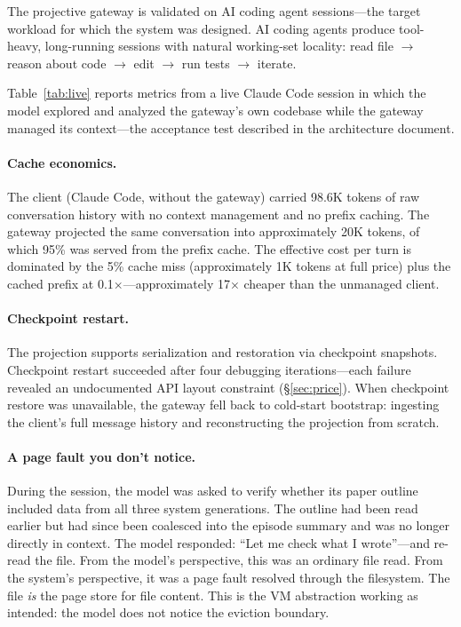 \documentclass[sigplan,screen,anonymous]{acmart}
\begin{document}
The projective gateway is validated on AI coding agent sessions---the
target workload for which the system was designed. AI coding agents
produce tool-heavy, long-running sessions with natural working-set
locality: read file $\to$ reason about code $\to$ edit $\to$ run
tests $\to$ iterate.

Table~\ref{tab:live} reports metrics from a live Claude Code session
in which the model explored and analyzed the gateway's own codebase
while the gateway managed its context---the acceptance test described
in the architecture document.

\paragraph{Cache economics.} The client (Claude Code, without the
gateway) carried 98.6K tokens of raw conversation history with no
context management and no prefix caching. The gateway projected the
same conversation into approximately 20K tokens, of which 95\% was
served from the prefix cache. The effective cost per turn is dominated
by the 5\% cache miss (approximately 1K tokens at full price) plus
the cached prefix at 0.1$\times$---approximately 17$\times$ cheaper
than the unmanaged client.

\paragraph{Checkpoint restart.} The projection supports serialization
and restoration via checkpoint snapshots. Checkpoint restart succeeded
after four debugging iterations---each failure revealed an
undocumented API layout constraint (\S\ref{sec:price}). When
checkpoint restore was unavailable, the gateway fell back to
cold-start bootstrap: ingesting the client's full message history and
reconstructing the projection from scratch.

\paragraph{A page fault you don't notice.} During the session, the
model was asked to verify whether its paper outline included data from
all three system generations. The outline had been read earlier but
had since been coalesced into the episode summary and was no longer
directly in context. The model responded: ``Let me check what I
wrote''---and re-read the file. From the model's perspective, this was
an ordinary file read. From the system's perspective, it was a page
fault resolved through the filesystem. The file \emph{is} the page
store for file content. This is the VM abstraction working as
intended: the model does not notice the eviction boundary.
\end{document}
